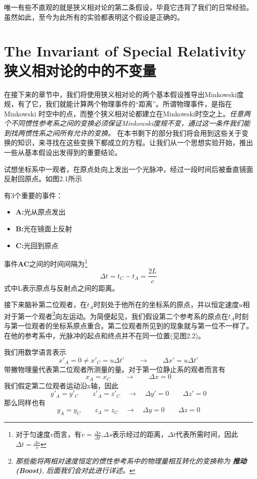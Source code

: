 唯一有些不直观的就是狭义相对论的第二条假设，毕竟它违背了我们的日常经验。虽然如此，至今为此所有的实验都表明这个假设是正确的。
\section[狭义相对论的中的不变量]{The Invariant of Special Relativity 狭义相对论的中的不变量}
\label{sec2.1}
在接下来的章节中，我们将使用狭义相对论的两个基本假设推导出Minkowski度规，有了它，我们就能计算两个物理事件的“距离”。所谓物理事件，是指在Minkowski 时空中的点，而整个狭义相对论都建立在Minkowski时空之上。{\it{任意两个不同惯性参考系之间的变换必须保证Minkowski度规不变，通过这一条件我们能到找两惯性系之间所有允许的变换。}}
在本书剩下的部分我们将会用到这些关于变换的知识，来寻找在这些变换下都成立的方程。让我们从一个思想实验开始，推出一些从基本假设出发得到的重要结论。

试想坐标系中一观者，在原点处向上发出一个光脉冲，经过一段时间后被垂直镜面反射回原点。如图2.1所示

有3个重要的事件：
\begin{itemize}
  \item {\bf{A:}}光从原点发出
  \item {\bf{B:}}光在镜面上反射
  \item {\bf{C:}}光回到原点
\end{itemize}
事件{\bf{AC}}之间的时间间隔为\footnote{对于匀速度$v$而言，有$v=\frac{\Delta s}{\Delta t}$,$\Delta s$表示经过的距离，$\Delta t$代表所需时间，因此$\Delta t=\frac{\Delta s}{v}$}
\begin{equation}\label{eq2.1}
\Delta t=t_C-t_A=\frac{2L}{c}
\end{equation}
式中L表示原点与反射点之间的距离。

接下来脑补第二位观者，在$t_A$时刻处于他所在的坐标系的原点，并以恒定速度$u$相对于第一个观者\footnote{\it{那些能将两相对速度恒定的惯性参考系中的物理量相互转化的变换称为
{\bf{推动(Boost)}}, 后面我们会对此进行详述。}}向左运动。为简便起见，我们假设第二个参考系的原点在$t_A$时刻与第一位观者的坐标系原点重合。第二位观者所见到的现象就与第一位不一样了。在他的参考系中，光脉冲的起点和终点并不在同一位置(见图2.2)。

我们用数学语言表示
\begin{equation}\label{eq2.2}
  x'_A=0 \neq x'_C=u \Delta t' \qquad \rightarrow \qquad \Delta x' =u \Delta t'
\end{equation}
带撇物理量代表第二位观者所测量的量。对于第一位静止系的观者而言有
\begin{equation}\label{eq2.3}
  x_A=x_C \qquad \rightarrow \qquad \Delta x=0
\end{equation}
我们假定第二位观者运动沿x轴，因此
\begin{equation}\label{eq2.4}
 y'_A=y'_C \quad  \quad z'_A=z'_C \quad \rightarrow \quad \Delta y'=0 \quad  \quad \Delta z'=0
\end{equation}
那么同样也有
\begin{equation}\label{eq2.5}
 y_A=y_C \quad  \quad z_A=z_C \quad \rightarrow \quad \Delta y=0 \quad  \quad \Delta z=0
\end{equation}

